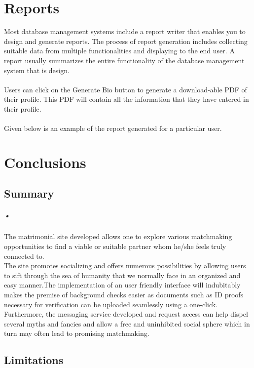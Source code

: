 \documentclass[12pt]{report}
\begin{document}
\chapter{Reports} 
Most database management systems include a report
writer that enables you to design and generate reports. The process of report generation includes
collecting suitable data from multiple functionalities and displaying to the end user. A report usually
summarizes the entire functionality of the database management system that is design. \\\\
Users can click on the Generate Bio button to generate a download-able PDF of their profile. This PDF will contain all the information that they have entered in their profile. \\\\
Given below is an example of the report generated for a particular user. 

\chapter{Conclusions}
\section{Summary}
\paragraph*{•}
 
 The matrimonial site developed allows one to explore various matchmaking opportunities to find a viable or suitable partner whom he/she feels truly connected to.\\

The site promotes socializing and offers numerous possibilities by allowing users to sift through the sea of humanity that we normally face in an organized and easy manner.The implementation of an user friendly interface will indubitably makes the premise of background checks easier as documents such as ID proofs necessary for verification can be uploaded seamlessly using a one-click.\\


Furthermore, the messaging service developed and request access can help dispel several myths and fancies and allow a free and uninhibited social sphere which in turn may often lead to promising matchmaking.


\section{Limitations}
\end{document}
